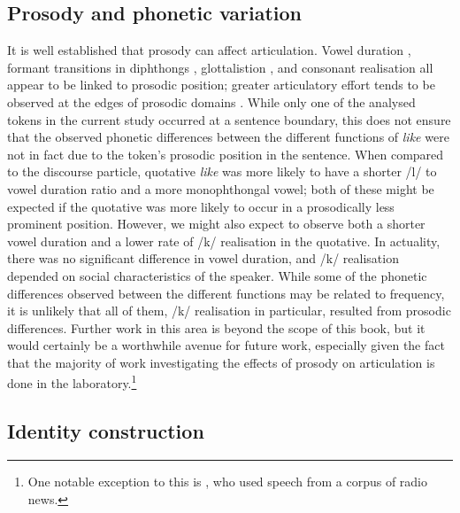 \subsection{Prosody and phonetic variation}\label{sec:prosody}

It is well established that prosody can affect articulation. Vowel duration \citep{edwardsbeckman1992}, formant transitions in diphthongs \citep{woutersmacon2002}, glottalistion \citep{dilleyetal1996}, and consonant realisation \citep{fougeronkeating1997} all appear to be linked to prosodic position; greater articulatory effort tends to be observed at the edges of  prosodic domains \citep{fougeronkeating1997}. While only one of the analysed tokens in the current study occurred at a sentence boundary, this does not ensure that the observed phonetic differences between the different functions of \textit{like} were not in fact due to the token's prosodic position in the sentence. When compared to the discourse particle, quotative \textit{like} was more likely to have a shorter /l/ to vowel duration ratio and a more monophthongal vowel; both of these might be expected if the quotative was more likely to occur in a prosodically less prominent position. However, we might also expect to observe both a shorter vowel duration and a lower rate of /k/ realisation in the quotative. In actuality, there was no significant difference in vowel duration, and /k/ realisation depended on social characteristics of the speaker. While some of the phonetic differences observed between the different functions may be related to frequency, it is unlikely that all of them, /k/ realisation in particular, resulted from prosodic differences. Further work in this area is beyond the scope of this book, but it would certainly be a worthwhile avenue for future work, especially given the fact that the majority of work investigating the effects of prosody on articulation is done in the laboratory.\footnote{One notable exception to this is \citet{coleetal2007}, who used speech from a corpus of radio news.\nocite{coleetal2007}} 

\subsection{Identity construction}\label{sec:idconstruction}

 

